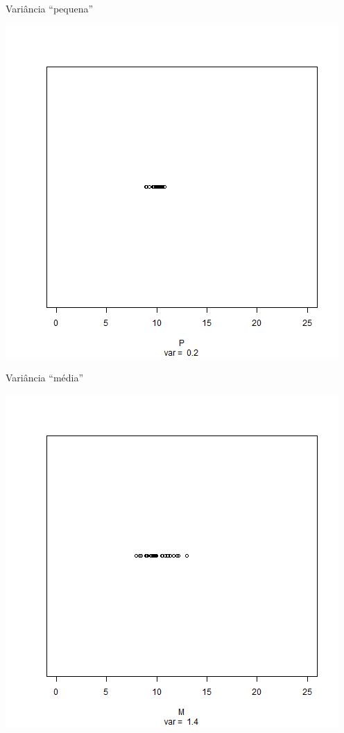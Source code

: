 \documentclass{beamer}
\begin{document}
\begin{frame}{Variância ``pequena''}
  \begin{center}
    \includegraphics[height=.8\textheight]{Cap17/dot-P}
  \end{center}
\end{frame}

\begin{frame}{Variância ``média''}
  \begin{center}
    \includegraphics[height=.8\textheight]{Cap17/dot-M}
  \end{center}
\end{frame}
\end{document}
